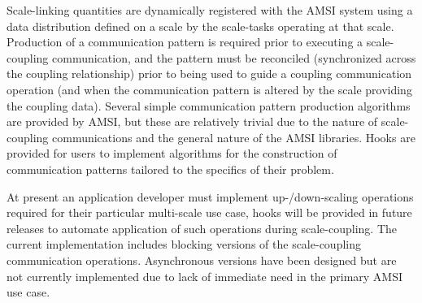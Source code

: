 \documentclass[11pt]{article}
\begin{document}
Scale-linking quantities are dynamically registered with the AMSI system using a data distribution defined on a scale by the scale-tasks operating at that scale. Production of a communication pattern is required prior to executing a scale-coupling communication, and the pattern must be reconciled (synchronized across the coupling relationship) prior to being used to guide a coupling communication operation (and when the communication pattern is altered by the scale providing the coupling data). Several simple communication pattern production algorithms are provided by AMSI, but these are relatively trivial due to the nature of scale-coupling communications and the general nature of the AMSI libraries. Hooks are provided for users to implement algorithms for the construction of communication patterns tailored to the specifics of their problem.

At present an application developer must implement up-/down-scaling operations required for their particular multi-scale use case, hooks will be provided in future releases to automate application of such operations during scale-coupling. The current implementation includes blocking versions of the scale-coupling communication operations. Asynchronous versions have been designed but are not currently implemented due to lack of immediate need in the primary AMSI use case.
\end{document}
